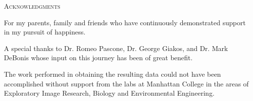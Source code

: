 \begin{center}
  \textsc{Acknowledgments}
\end{center}
%
\noindent
%
For my parents, family and friends who have continuously demonstrated support in my pursuit of happiness.


A special thanks to Dr. Romeo Pascone, Dr. George Giakos, and Dr. Mark DeBonis whose input on this journey has been of great benefit.


The work performed in obtaining the resulting data could not have been accomplished without support from the labs at Manhattan College in the areas of Exploratory Image Research, Biology and Environmental Engineering.
